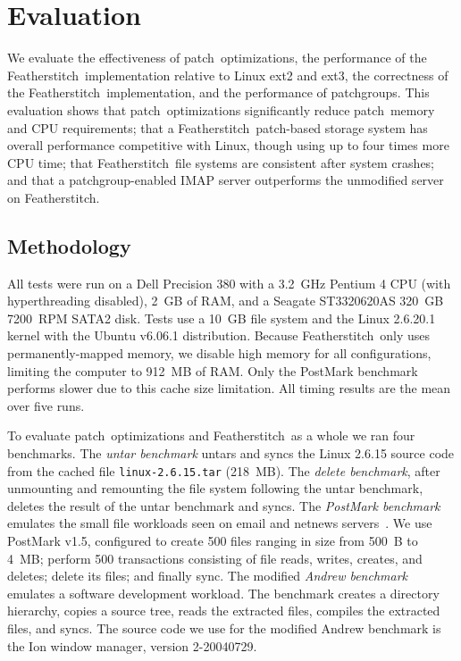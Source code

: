 \documentclass[9pt,twocolumn,letterpaper]{article}
\newcommand{\Kudos}{Featherstitch}
\newcommand{\patch}{patch}
\newcommand{\patchgroup}{patchgroup}
\newcommand{\patchgroups}{patchgroups}
\begin{document}
\section {Evaluation}
\label{sec:evaluation}
\label{eval}

We evaluate
%
the effectiveness of \patch\ optimizations,
%
the performance of the \Kudos\ implementation relative to Linux ext2
and ext3,
%
the correctness of the \Kudos\ implementation,
%
and the performance of \patchgroups.
%
This evaluation shows
%
that \patch\ optimizations significantly reduce \patch\ memory and CPU
requirements;
%
that a \Kudos\ \patch-based storage system has overall performance
competitive with Linux, though using up to four times more CPU time;
%
that \Kudos\ file systems are consistent after system crashes;
%
and that a \patchgroup-enabled IMAP server outperforms
the unmodified server on \Kudos.

\subsection{Methodology}

All tests were run on a Dell Precision 380 with a 3.2~GHz Pentium 4
CPU (with hyperthreading disabled), 2~GB of RAM, and a Seagate ST3320620AS 320~GB 7200~RPM SATA2 disk.
%
Tests use a 10~GB file system and the Linux 2.6.20.1 kernel
with the Ubuntu v6.06.1 distribution.
%
Because \Kudos\ only uses permanently-mapped memory, we disable high
memory for all configurations, limiting the computer to 912~MB of RAM.
%
Only the PostMark benchmark performs slower due to this cache size limitation.
%
All timing results are the mean over five runs.

To evaluate \patch\ optimizations and \Kudos\ as a whole we ran four
benchmarks.
%
The \emph{untar benchmark} untars and syncs the Linux 2.6.15 source code
from the cached file \texttt{linux-2.6.15.tar} (218~MB).
%
The \emph{delete benchmark}, after unmounting and remounting the file
system following the untar benchmark, deletes the result of the untar
benchmark and syncs.
%
The \emph{PostMark benchmark} emulates the small file workloads seen
on email and netnews servers~\cite{postmark}. We use PostMark v1.5,
configured to create 500 files ranging in size from 500~B to 4~MB;
perform 500 transactions consisting of file reads, writes, creates,
and deletes; delete its files; and finally sync.
%
The modified \emph{Andrew benchmark} emulates a software development
workload.  The benchmark creates a directory hierarchy, copies a
source tree, reads the extracted files, compiles the extracted files,
and syncs. The source code we use for the modified Andrew benchmark is
the Ion window manager, version 2-20040729.
\end{document}
